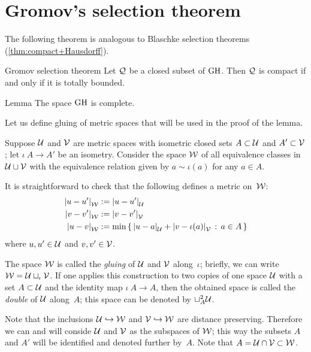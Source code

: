 \section{Gromov's selection theorem}

The following theorem is analogous to Blaschke selection theorems (\ref{thm:compact+Hausdorff}).

\begin{thm}{Gromov selection theorem}\label{thm:gromov-compactness}
Let $\mathcal{Q}$ be a closed subset of $\operatorname{\rm GH}\nolimits$.
Then $\mathcal{Q}$ is compact if and only if it is totally bounded.
\end{thm}

\begin{thm}{Lemma}\label{lem:GH-complete}
The space $\operatorname{\rm GH}\nolimits$ is complete.
\end{thm}


Let us define gluing of metric spaces that will be used in the proof of the lemma.

Suppose 
$\mathcal{U}$ and $\mathcal{V}$ are metric spaces 
with isometric closed sets $A\subset\mathcal{U}$ and $A'\subset\mathcal{V}$;
let $\iota\:A\to A'$ be an isometry.
Consider the space $\mathcal{W}$ of all equivalence classes in $\mathcal{U}\sqcup\mathcal{V}$ with the equivalence relation given by $a\sim\iota(a)$ for any $a\in A$.

It is straightforward to check that the following defines a metric on~$\mathcal{W}$:
\begin{align*}
\dist{u}{u'}{\spc{W}}&\df\dist{u}{u'}{\spc{U}}
\\
\dist{v}{v'}{\spc{W}}&\df\dist{v}{v'}{\spc{V}}
\\
\dist{u}{v}{\spc{W}}&\df\min\set{\dist{u}{a}{\spc{U}}+\dist{v}{\iota(a)}{\spc{V}}}{a\in A}
\end{align*}
where $u,u'\in \mathcal{U}$ and $v,v'\in \mathcal{V}$.

The  space $\mathcal{W}$ is called the \emph{gluing} of $\mathcal{U}$ and  $\mathcal{V}$ along~$\iota$; briefly, we can write
$\mathcal{W}=\mathcal{U}\sqcup_\iota\mathcal{V}$.
If one applies this construction to two copies of one space $\mathcal{U}$ with a set $A\subset \mathcal{U}$ and the identity map $\iota\:A\to A$, then the obtained space is called the \emph{double} of $\mathcal{U}$ along~$A$; this space can be denoted by $\sqcup_A^2\mathcal{U}$.

Note that the inclusions $\mathcal{U}\hookrightarrow \mathcal{W}$ and $\mathcal{V}\hookrightarrow \mathcal{W}$ are distance preserving.
Therefore we can and will conside $\mathcal{U}$ and $\mathcal{V}$ as the subspaces of $\mathcal{W}$;
this way the subsets $A$ and $A'$ will be identified and denoted further by~$A$.
Note that $A=\mathcal{U}\cap \mathcal{V}\subset \mathcal{W}$.

